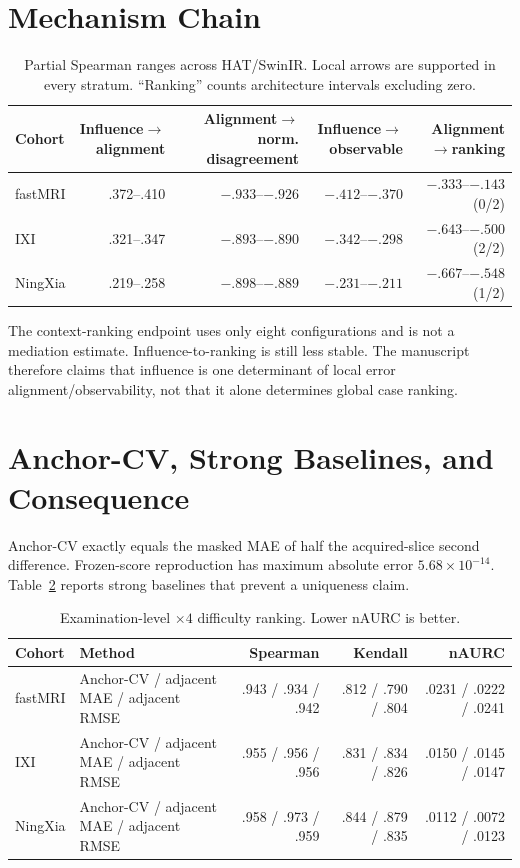 \documentclass[10pt,twocolumn,letterpaper]{article}
\begin{document}
\section{Mechanism Chain}
\begin{table}[t]
\centering
\caption{Partial Spearman ranges across HAT/SwinIR. Local arrows are supported in every stratum. “Ranking” counts architecture intervals excluding zero.}
\label{tab:chain}
\setlength{\tabcolsep}{3.5pt}
\begin{tabular}{lrrrr}
\toprule
Cohort & Influence$\rightarrow$alignment & Alignment$\rightarrow$norm. disagreement & Influence$\rightarrow$observable & Alignment$\rightarrow$ranking \\
\midrule
fastMRI & .372--.410 & $-.933$--$-.926$ & $-.412$--$-.370$ & $-.333$--$-.143$ (0/2) \\
IXI & .321--.347 & $-.893$--$-.890$ & $-.342$--$-.298$ & $-.643$--$-.500$ (2/2) \\
NingXia & .219--.258 & $-.898$--$-.889$ & $-.231$--$-.211$ & $-.667$--$-.548$ (1/2) \\
\bottomrule
\end{tabular}
\end{table}

The context-ranking endpoint uses only eight configurations and is not a mediation estimate. Influence-to-ranking is still less stable. The manuscript therefore claims that influence is one determinant of local error alignment/observability, not that it alone determines global case ranking.

\section{Anchor-CV, Strong Baselines, and Consequence}
Anchor-CV exactly equals the masked MAE of half the acquired-slice second difference. Frozen-score reproduction has maximum absolute error $5.68\times10^{-14}$. Table~\ref{tab:anchor} reports strong baselines that prevent a uniqueness claim.

\begin{table}[t]
\centering
\caption{Examination-level $\times4$ difficulty ranking. Lower nAURC is better.}
\label{tab:anchor}
\setlength{\tabcolsep}{5pt}
\begin{tabular}{llrrr}
\toprule
Cohort & Method & Spearman & Kendall & nAURC \\
\midrule
fastMRI & Anchor-CV / adjacent MAE / adjacent RMSE & .943 / .934 / .942 & .812 / .790 / .804 & .0231 / .0222 / .0241 \\
IXI & Anchor-CV / adjacent MAE / adjacent RMSE & .955 / .956 / .956 & .831 / .834 / .826 & .0150 / .0145 / .0147 \\
NingXia & Anchor-CV / adjacent MAE / adjacent RMSE & .958 / .973 / .959 & .844 / .879 / .835 & .0112 / .0072 / .0123 \\
\bottomrule
\end{tabular}
\end{table}
\end{document}
